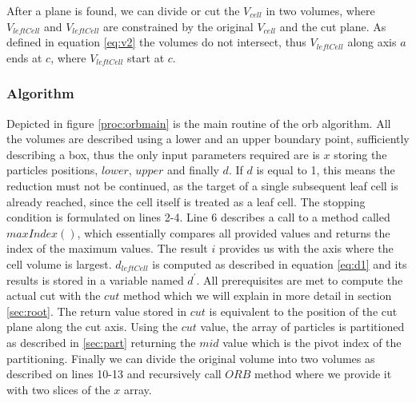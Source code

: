 \documentclass[]{article}
\begin{document}
After a plane is found, we can divide or cut the $V_{cell}$ in two volumes, where $V_{leftCell}$ and $V_{leftCell}$ are constrained by the original $V_{cell}$ and the cut plane. As defined in equation \ref{eq:v2} the volumes do not intersect, thus $V_{leftCell}$ along axis $a$ ends at $c$, where $V_{leftCell}$ start at $c$.
    
  
\subsubsection{Algorithm}

Depicted in figure \ref{proc:orbmain} is the main routine of the orb algorithm. All the volumes are described using a lower and an upper boundary point, sufficiently describing a box, thus the only input parameters required are is $x$ storing the particles positions, $lower$, $upper$ and finally $d$.
If $d$ is equal to 1, this means the reduction must not be continued, as the target of a single subsequent leaf cell is already reached, since the cell itself is treated as a leaf cell. The stopping condition is formulated on lines 2-4. 
Line 6 describes a call to a method called $maxIndex()$, which essentially compares all provided values and returns the index of the maximum values. The result $i$ provides us with the axis where the cell volume is largest. 
$d_{leftCell}$ is computed as described in equation \ref{eq:d1} and its results is stored in a variable named $d^\prime$. All prerequisites are met to compute the actual cut with the $cut$ method which we will explain in more detail in section \ref{sec:root}. The return value stored in $cut$ is equivalent to the position of the cut plane along the cut axis. Using the $cut$ value, the array of particles is partitioned as described in \ref{sec:part} returning the $mid$ value which is the pivot index of the partitioning.
Finally we can divide the original volume into two volumes as described on lines 10-13 and recursively call $ORB$ method where we provide it with two slices of the $x$ array.
\end{document}
